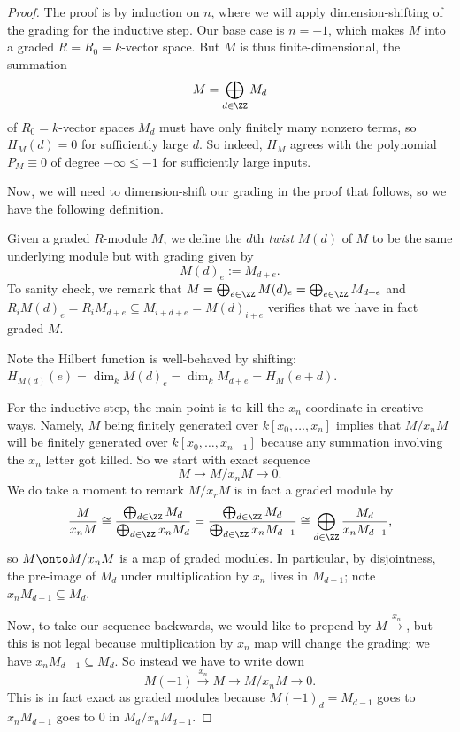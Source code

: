 \documentclass[../notes.tex]{subfiles}
\begin{document}
\begin{proof}
	The proof is by induction on $n$, where we will apply dimension-shifting of the grading for the inductive step. Our base case is $n=-1$, which makes $M$ into a graded $R=R_0=k$-vector space. But $M$ is thus finite-dimensional, the summation
	\[M=\bigoplus_{d\in\ZZ}M_d\]
	of $R_0=k$-vector spaces $M_d$ must have only finitely many nonzero terms, so $H_M(d)=0$ for sufficiently large $d$. So indeed, $H_M$ agrees with the polynomial $P_M\equiv0$ of degree $-\infty\le-1$ for sufficiently large inputs.

	Now, we will need to dimension-shift our grading in the proof that follows, so we have the following definition.
	\begin{definition}[Twist]
		Given a graded $R$-module $M$, we define the $d$th \textit{twist} $M(d)$ of $M$ to be the same underlying module but with grading given by
		\[M(d)_e:=M_{d+e}.\]
		To sanity check, we remark that $M=\bigoplus_{e\in\ZZ}M(d)_e=\bigoplus_{e\in\ZZ}M_{d+e}$ and $R_iM(d)_e=R_iM_{d+e}\subseteq M_{i+d+e}=M(d)_{i+e}$ verifies that we have in fact graded $M$.
	\end{definition}
	Note the Hilbert function is well-behaved by shifting: $H_{M(d)}(e)=\dim_kM(d)_e=\dim_kM_{d+e}=H_M(e+d)$.

	For the inductive step, the main point is to kill the $x_n$ coordinate in creative ways. Namely, $M$ being finitely generated over $k[x_0,\ldots,x_n]$ implies that $M/x_nM$ will be finitely generated over $k[x_0,\ldots,x_{n-1}]$ because any summation involving the $x_n$ letter got killed. So we start with exact sequence
	\[M\to M/x_nM\to 0.\]
	We do take a moment to remark $M/x_rM$ is in fact a graded module by
	\[\frac M{x_nM}\cong\frac{\bigoplus_{d\in\ZZ}M_d}{\bigoplus_{d\in\ZZ}x_nM_d}=\frac{\bigoplus_{d\in\ZZ}M_d}{\bigoplus_{d\in\ZZ}x_nM_{d-1}}\cong\bigoplus_{d\in\ZZ}\frac{M_d}{x_nM_{d-1}},\]
	so $M\onto M/x_nM$ is a map of graded modules. In particular, by disjointness, the pre-image of $M_d$ under multiplication by $x_n$ lives in $M_{d-1}$; note $x_nM_{d-1}\subseteq M_d$.
	
	Now, to take our sequence backwards, we would like to prepend by $M\stackrel{x_n}\to$, but this is not legal because multiplication by $x_n$ map will change the grading: we have $x_nM_{d-1}\subseteq M_d$. So instead we have to write down
	\[M(-1)\stackrel{x_n}\to M\to M/x_nM\to 0.\]
	This is in fact exact as graded modules because $M(-1)_d=M_{d-1}$ goes to $x_nM_{d-1}$ goes to $0$ in $M_d/x_nM_{d-1}$.
	

\end{proof}
\end{document}
